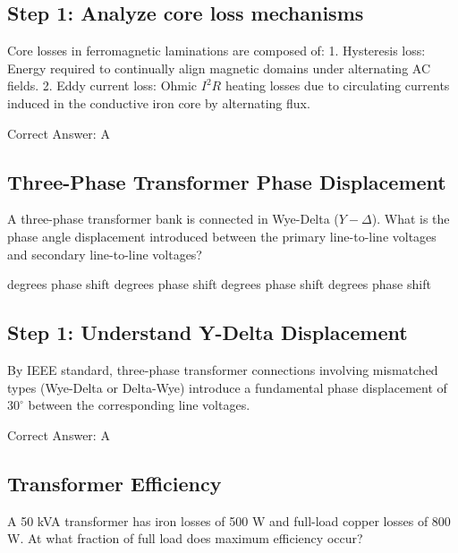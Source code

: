 \begin{solution}

\subsection*{Step 1: Analyze core loss mechanisms}
Core losses in ferromagnetic laminations are composed of:
1. Hysteresis loss: Energy required to continually align magnetic domains under alternating AC fields.
2. Eddy current loss: Ohmic $I^2R$ heating losses due to circulating currents induced in the conductive iron core by alternating flux.

Correct Answer: A
\end{solution}

\clearpage

\subsection{Three-Phase Transformer Phase Displacement}

A three-phase transformer bank is connected in Wye-Delta ($Y-\Delta$). What is the phase angle displacement introduced between the primary line-to-line voltages and secondary line-to-line voltages?

\begin{choices}
     degrees phase shift
     degrees phase shift
     degrees phase shift
     degrees phase shift
\end{choices}

\begin{solution}

\subsection*{Step 1: Understand Y-Delta Displacement}
By IEEE standard, three-phase transformer connections involving mismatched types (Wye-Delta or Delta-Wye) introduce a fundamental phase displacement of $30^\circ$ between the corresponding line voltages.

Correct Answer: A
\end{solution}

\clearpage

\subsection{Transformer Efficiency}

A 50 kVA transformer has iron losses of 500 W and full-load copper losses of 800 W. At what fraction of full load does maximum efficiency occur?

